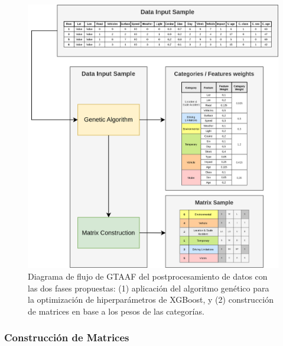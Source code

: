 \documentclass{uathesis-es}
\begin{document}
	\begin{figure}[H]
		\centering
		\includegraphics[width=14cm]{Figures/Postprocessing_2.png}
		\caption{Diagrama de flujo de GTAAF del postprocesamiento de datos con las dos fases propuestas: (1) aplicación del algoritmo genético para la optimización de hiperparámetros de XGBoost, y (2) construcción de matrices en base a los pesos de las categorías.}
		\label{PostprocessingStage}
	\end{figure}
	
	\subsubsection{Construcción de Matrices}
	
\end{document}
